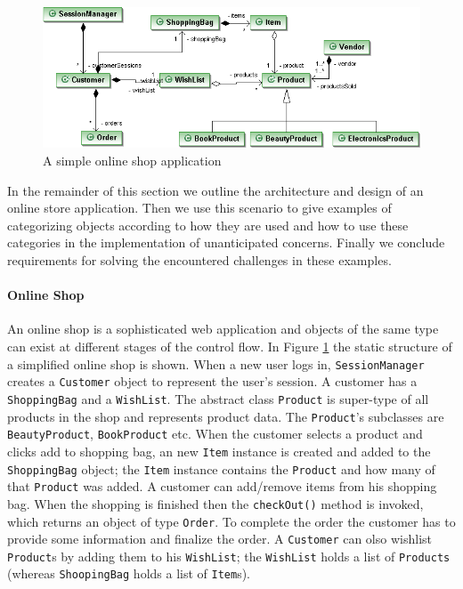\documentclass{llncs}
\begin{document}
\begin{figure}[h]
\includegraphics[width=\textwidth]{images/myonlineshop.png}%
\caption{A simple online shop application}%
\label{fig:shop}%
\end{figure}

In the remainder of this section we outline the architecture and design of an online store application. Then we use this scenario to give examples of categorizing objects according to how they are used and how to use these categories in the implementation of unanticipated concerns. Finally we conclude requirements for solving the encountered challenges in these examples.

\paragraph{Online Shop}
An online shop is a sophisticated web application and objects of the same type can exist at different stages of the control flow. In Figure \ref{fig:shop} the static structure of a simplified online shop is shown. When a new user logs in, \texttt{SessionManager} creates a \texttt{Customer} object to represent the user's session. A customer has a \texttt{ShoppingBag} and a \texttt{WishList}. The abstract class \texttt{Product} is super-type of all products in the shop and represents product data. The \texttt{Product}'s subclasses are \texttt{BeautyProduct}, \texttt{BookProduct} etc. When the customer selects a product and clicks add to shopping bag, an new \texttt{Item} instance is created and added to the \texttt{ShoppingBag} object; the \texttt{Item} instance contains the \texttt{Product} and how many of that \texttt{Product} was added. A customer can add/remove items from his shopping bag. When the shopping is finished then the \texttt{checkOut()} method is invoked, which returns an object of type \texttt{Order}. To complete the order the customer has to provide some information and finalize the order. A \texttt{Customer} can olso wishlist \texttt{Product}s by adding them to his \texttt{WishList}; the \texttt{WishList} holds a list of \texttt{Products} (whereas \texttt{ShoopingBag} holds a list of \texttt{Item}s).
\end{document}
